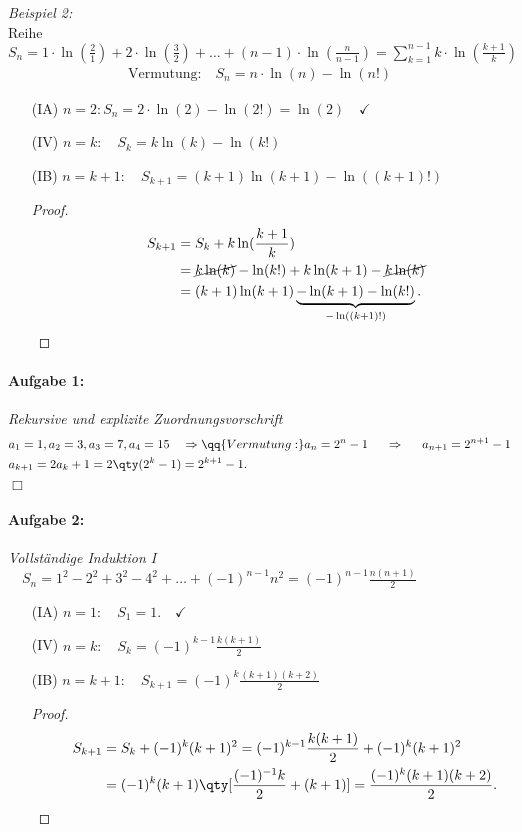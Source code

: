 \emph{Beispiel 2:}\\
Reihe $S_n = 1\cdot \ln(\frac{2}{1}) + 2\cdot \ln(\frac{3}{2}) + \hdots + (n-1) \cdot \ln(\frac{n}{n-1}) = \sum_{k=1}^{n-1} k \cdot \ln(\frac{k+1}{k})$
\begin{align}
        \text{Vermutung:} \quad S_n = n \cdot \ln(n) - \ln(n!)
\end{align}
\begin{enumerate}
    \item[(IA)] $n=2: S_n = 2 \cdot \ln(2) - \ln(2!) = \ln(2) \quad\checkmark$ 
    \item[(IV)] $n=k: \quad S_k = k \ln(k) - \ln(k!) $
    \item[(IB)] $n=k+1: \quad S_{k+1}= (k+1)\ln(k+1) - \ln((k+1)!)$
    \begin{proof}$~$\\[-1.5cm]
        \begin{align}
            \qquad S_{k+1} &= S_k + k \ln(\frac{k+1}{k}) \\
                           &= \cancel{k \ln(k)} - \ln(k!) + k \ln(k+1) - \cancel{k \ln(k)} \\
                           &= (k+1) \ln(k+1) \underbrace{-\ln(k+1)-\ln(k!)}_{-\ln((k+1)!)}.
        \end{align}
    \end{proof}
\end{enumerate}

\paragraph{Aufgabe 1: } \emph{Rekursive und explizite Zuordnungsvorschrift}
\begin{align}
    & a_1 = 1, a_2 = 3, a_3 = 7, a_4 = 15 \quad \Rightarrow \qq{Vermutung: } a_n=2^n-1 \hspace{0.5cm} \Rightarrow \hspace{0.5cm} a_{n+1}=2^{n+1}-1 \\
    &a_{k+1}=2a_k+1=2\qty(2^k-1)=2^{k+1}-1.
\end{align}\hfill $\Box$
%
\paragraph{Aufgabe 2: } \emph{Vollständige Induktion I} $\quad S_n = 1^2 -2^2 + 3^2 -4^2 + \hdots + (-1)^{n-1}n^2 = (-1)^{n-1}\frac{n(n+1)}{2}$
\begin{enumerate}
    \item[(IA)] $n=1: \quad S_1 = 1. \quad\checkmark$ 
    \item[(IV)] $n=k: \quad S_k=(-1)^{k-1}\frac{k(k+1)}{2}$
    \item[(IB)] $n=k+1: \quad S_{k+1}=(-1)^{k}\frac{(k+1)(k+2)}{2}$
    \begin{proof}$~$\\[-1.5cm]
        \begin{align}
            \qquad S_{k+1} &= S_k + (-1)^k (k+1)^2 =(-1)^{k-1}\frac{k(k+1)}{2}+(-1)^k(k+1)^2\\
            &=(-1)^k(k+1)\qty[\frac{(-1)^{-1}k}{2}+(k+1)]=\frac{(-1)^{k}(k+1)(k+2)}{2}.
        \end{align}
    \end{proof}
\end{enumerate}
%
